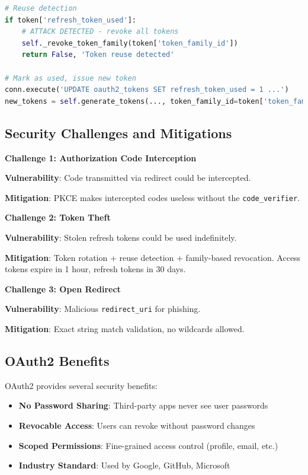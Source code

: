 \documentclass[12pt,a4paper]{article}
\begin{document}
\begin{lstlisting}[language=Python]
# Reuse detection
if token['refresh_token_used']:
    # ATTACK DETECTED - revoke all tokens
    self._revoke_token_family(token['token_family_id'])
    return False, 'Token reuse detected'

# Mark as used, issue new token
conn.execute('UPDATE oauth2_tokens SET refresh_token_used = 1 ...')
new_tokens = self.generate_tokens(..., token_family_id=token['token_family_id'])
\end{lstlisting}

\subsection{Security Challenges and Mitigations}

\textbf{Challenge 1: Authorization Code Interception}

\textbf{Vulnerability}: Code transmitted via redirect could be intercepted.

\textbf{Mitigation}: PKCE makes intercepted codes useless without the \texttt{code\_verifier}.

\textbf{Challenge 2: Token Theft}

\textbf{Vulnerability}: Stolen refresh tokens could be used indefinitely.

\textbf{Mitigation}: Token rotation + reuse detection + family-based revocation. Access tokens expire in 1 hour, refresh tokens in 30 days.

\textbf{Challenge 3: Open Redirect}

\textbf{Vulnerability}: Malicious \texttt{redirect\_uri} for phishing.

\textbf{Mitigation}: Exact string match validation, no wildcards allowed.

\subsection{OAuth2 Benefits}

OAuth2 provides several security benefits:
\begin{itemize}
    \item \textbf{No Password Sharing}: Third-party apps never see user passwords
    \item \textbf{Revocable Access}: Users can revoke without password changes
    \item \textbf{Scoped Permissions}: Fine-grained access control (profile, email, etc.)
    \item \textbf{Industry Standard}: Used by Google, GitHub, Microsoft
\end{itemize}
\end{document}
